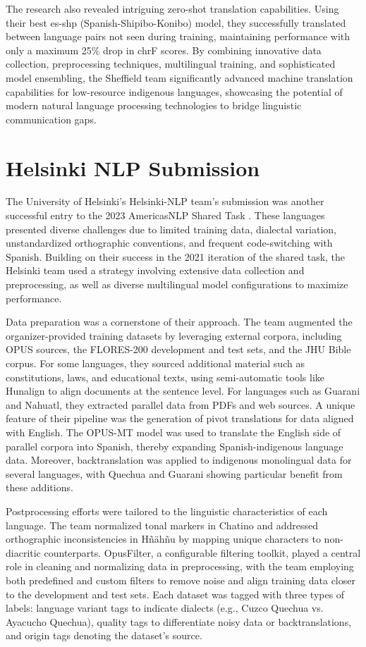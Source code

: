 The research also revealed intriguing zero-shot translation capabilities. Using their best es-shp (Spanish-Shipibo-Konibo) model, they successfully translated between language pairs not seen during training, maintaining performance with only a maximum 25\% drop in chrF scores.
 By combining innovative data collection, preprocessing techniques, multilingual training, and sophisticated model ensembling, the Sheffield team significantly advanced machine translation capabilities for low-resource indigenous languages, showcasing the potential of modern natural language processing technologies to bridge linguistic communication gaps.

\section{Helsinki NLP Submission}
The University of Helsinki’s Helsinki-NLP team’s submission was another successful entry to the 2023 AmericasNLP Shared Task \cite{de-gibert-etal-2023-four}. These languages presented diverse challenges due to limited training data, dialectal variation, unstandardized orthographic conventions, and frequent code-switching with Spanish. Building on their success in the 2021 iteration of the shared task, the Helsinki team used a strategy involving extensive data collection and preprocessing, as well as diverse multilingual model configurations to maximize performance.

Data preparation was a cornerstone of their approach. The team augmented the organizer-provided training datasets by leveraging external corpora, including OPUS sources, the FLORES-200 development and test sets, and the JHU Bible corpus. For some languages, they sourced additional material such as constitutions, laws, and educational texts, using semi-automatic tools like Hunalign to align documents at the sentence level. For languages such as Guarani and Nahuatl, they extracted parallel data from PDFs and web sources. A unique feature of their pipeline was the generation of pivot translations for data aligned with English. The OPUS-MT model was used to translate the English side of parallel corpora into Spanish, thereby expanding Spanish-indigenous language data. Moreover, backtranslation was applied to indigenous monolingual data for several languages, with Quechua and Guarani showing particular benefit from these additions.

Postprocessing efforts were tailored to the linguistic characteristics of each language. The team normalized tonal markers in Chatino and addressed orthographic inconsistencies in Hñähñu by mapping unique characters to non-diacritic counterparts. OpusFilter, a configurable filtering toolkit, played a central role in cleaning and normalizing data in preprocessing, with the team employing both predefined and custom filters to remove noise and align training data closer to the development and test sets. Each dataset was tagged with three types of labels: language variant tags to indicate dialects (e.g., Cuzco Quechua vs. Ayacucho Quechua), quality tags to differentiate noisy data or backtranslations, and origin tags denoting the dataset’s source.

